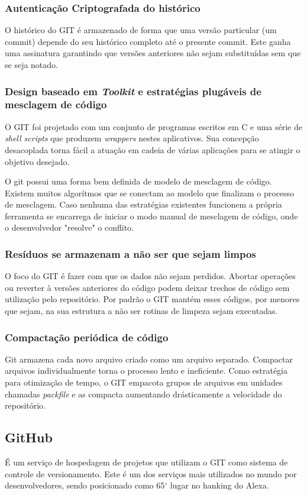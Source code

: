 \documentclass[
	article,			%
	12pt,				%
	oneside,			%
	a4paper,			%
	english,			%
	brazil,				%
	sumario=tradicional
	]{abntex2}
\begin{document}
\subsubsection{Autenticação Criptografada do histórico}
O histórico do GIT é armazenado de forma que uma versão particular (um commit) depende do seu histórico completo até o presente commit. Este ganha uma assinatura garantindo que versões anteriores não sejam substituídas sem que se seja notado.

\subsubsection{Design baseado em \textit{Toolkit} e estratégias plugáveis de mesclagem de código}
O GIT foi projetado com um conjunto de programas escritos em C e uma série de \textit{shell scripts} que produzem \textit{wrappers} nestes aplicativos. Sua concepção desacoplada torna fácil a atuação em cadeia de várias aplicações para se atingir o objetivo desejado.

O git possui uma forma bem definida de modelo de mesclagem de código. Existem muitos algorítmos que se conectam ao modelo que finalizam o processo de mesclagem. Caso nenhuma das estratégias existentes funcionem a própria ferramenta se encarrega de iniciar o modo manual de mesclagem de código, onde o desenvolvedor "resolve" o conflito.

\subsubsection{Resíduos se armazenam a não ser que sejam limpos}
O foco do GIT é fazer com que os dados não sejam perdidos. Abortar operações ou reverter à versões anteriores do código podem deixar trechos de código sem utilização pelo repositório. Por padrão o GIT mantém esses códigos, por menores que sejam, na sua estrutura a não ser rotinas de limpeza sejam executadas.

\subsubsection{Compactação periódica de código}
Git armazena cada novo arquivo criado como um arquivo separado. Compactar arquivos individualmente torna o processo lento e ineficiente. Como estratégia para otimização de tempo, o GIT empacota grupos de arquivos em unidades chamadas \textit{packfile} e as compacta aumentando drásticamente a velocidade do repositório.

\subsection{GitHub}
É um serviço de hospedagem de projetos que utilizam o GIT como sistema de controle de versionamento. Este é um dos serviços mais utilizados no mundo por desenvolvedores, sendo posicionado como 65$^{\circ}$ lugar no hanking do Alexa.
\end{document}
